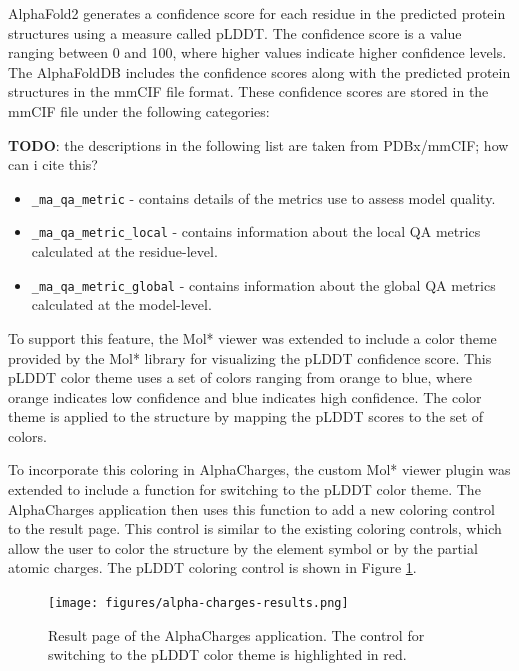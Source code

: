 \documentclass[
  digital,     %
  oneside,     %
  nosansbold,  %
  nocolorbold, %
  lof,         %
  lot,         %
]{fithesis4}
\begin{document}
AlphaFold2 generates a confidence score for each residue in the predicted protein structures using a measure called pLDDT. The confidence score is a value ranging between 0 and 100, where higher values indicate higher confidence levels. \cite{varadi2021alphafold} The AlphaFoldDB includes the confidence scores along with the predicted protein structures in the mmCIF file format. These confidence scores are stored in the mmCIF file under the following categories:

\textbf{TODO}: the descriptions in the following list are taken from PDBx/mmCIF; how can i cite this? \\

\begin{itemize}
  \item \texttt{\_ma\_qa\_metric} - contains details of the metrics use to assess model quality.
  \item \texttt{\_ma\_qa\_metric\_local} - contains information about the local QA metrics calculated at the residue-level.
  \item \texttt{\_ma\_qa\_metric\_global} - contains information about the global QA metrics calculated at the model-level.
\end{itemize}

To support this feature, the Mol* viewer was extended to include a color theme provided by the Mol* library for visualizing the pLDDT confidence score. This pLDDT color theme uses a set of colors ranging from orange to blue, where orange indicates low confidence and blue indicates high confidence. The color theme is applied to the structure by mapping the pLDDT scores to the set of colors.

To incorporate this coloring in AlphaCharges, the custom Mol* viewer plugin was extended to include a function for switching to the pLDDT color theme. The AlphaCharges application then uses this function to add a new coloring control to the result page. This control is similar to the existing coloring controls, which allow the user to color the structure by the element symbol or by the partial atomic charges. The pLDDT coloring control is shown in Figure \ref{fig:alpha-charges-results}.

\begin{figure}[htbp]
  \begin{center}
    \texttt{[image: figures/alpha-charges-results.png]}
  \end{center}
  \caption{Result page of the AlphaCharges application. The control for switching to the pLDDT color theme is highlighted in red.}
  \label{fig:alpha-charges-results}
\end{figure}
\end{document}
